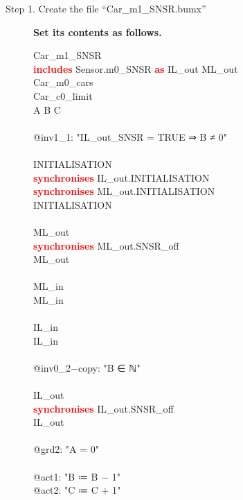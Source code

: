 \begin{description}
	\item[Step 1. Create the file ``Car\_m1\_SNSR.bumx''] \textbf{Set its contents as follows.}
	
		\begin{center}
		\begin{Bcode}
			\ifplastex
			\Bmachine{} Car_m1_SNSR\\
			\textcolor{red}{\textbf{includes}} Sensor.m0_SNSR \textcolor{red}{\textbf{as}} IL_out ML_out\\
			\Brefines{} Car_m0_cars\\
			\Bsees{} Car_c0_limit\\
			\Bvariables{} A B C\\
			\Binvariants\\
			@inv1_1: "IL_out_SNSR = TRUE ⇒ B ≠ 0"\\
			\Bevents\\
			INITIALISATION \Bextended\\
			\textcolor{red}{\textbf{synchronises}} IL_out.INITIALISATION\\
			\textcolor{red}{\textbf{synchronises}} ML_out.INITIALISATION\\
			\Brefines{} INITIALISATION\\
			\Bend\\
			ML_out \Bextended\\
			\textcolor{red}{\textbf{synchronises}} ML_out.SNSR_off\\
			\Brefines{} ML_out\\
			\Bend\\
			ML_in \Bextended\\
			\Brefines{} ML_in\\
			\Bend\\
			IL_in \Bextended\\
			\Brefines{} IL_in\\
			\Bwhen\\
			@inv0_2−copy: "B ∈ ℕ" \Btheorem\\
			\Bend\\
			IL_out\\
			\textcolor{red}{\textbf{synchronises}} IL_out.SNSR_off\\
			\Brefines{} IL_out\\
			\Bwhen\\
			@grd2: "A = 0"\\
			\Bthen\\
			@act1: "B ≔ B − 1"\\
			@act2: "C ≔ C + 1"\\

\end{Bcode}
\end{center}
\end{description}
